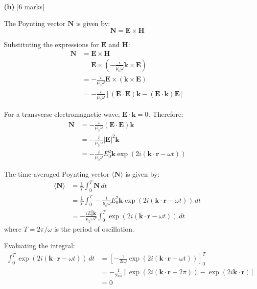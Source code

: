 \documentclass{article}
\begin{document}
\textbf{(b)} [6 marks]

The Poynting vector $\mathbf{N}$ is given by:
\begin{equation*}
\mathbf{N} = \mathbf{E} \times \mathbf{H}
\end{equation*}

Substituting the expressions for $\mathbf{E}$ and $\mathbf{H}$:
\begin{align*}
\mathbf{N} &= \mathbf{E} \times \mathbf{H} \\
&= \mathbf{E} \times \left( -\frac{i}{\mu_0 \omega} \mathbf{k} \times \mathbf{E} \right) \\
&= -\frac{i}{\mu_0 \omega} \mathbf{E} \times (\mathbf{k} \times \mathbf{E}) \\
&= -\frac{i}{\mu_0 \omega} [(\mathbf{E} \cdot \mathbf{E}) \mathbf{k} - (\mathbf{E} \cdot \mathbf{k}) \mathbf{E}]
\end{align*}

For a transverse electromagnetic wave, $\mathbf{E} \cdot \mathbf{k} = 0$. Therefore:
\begin{align*}
\mathbf{N} &= -\frac{i}{\mu_0 \omega} (\mathbf{E} \cdot \mathbf{E}) \mathbf{k} \\
&= -\frac{i}{\mu_0 \omega} |\mathbf{E}|^2 \mathbf{k} \\
&= -\frac{i}{\mu_0 \omega} E_0^2 \mathbf{k} \exp(2i (\mathbf{k} \cdot \mathbf{r} - \omega t))
\end{align*}

The time-averaged Poynting vector $\langle \mathbf{N} \rangle$ is given by:
\begin{align*}
\langle \mathbf{N} \rangle &= \frac{1}{T} \int_0^T \mathbf{N} \, dt \\
&= \frac{1}{T} \int_0^T -\frac{i}{\mu_0 \omega} E_0^2 \mathbf{k} \exp(2i (\mathbf{k} \cdot \mathbf{r} - \omega t)) \, dt \\
&= -\frac{i E_0^2 \mathbf{k}}{\mu_0 \omega T} \int_0^T \exp(2i (\mathbf{k} \cdot \mathbf{r} - \omega t)) \, dt
\end{align*}
where $T = 2\pi/\omega$ is the period of oscillation.

Evaluating the integral:
\begin{align*}
\int_0^T \exp(2i (\mathbf{k} \cdot \mathbf{r} - \omega t)) \, dt &= \left[ -\frac{1}{2i\omega} \exp(2i (\mathbf{k} \cdot \mathbf{r} - \omega t)) \right]_0^T \\
&= -\frac{1}{2i\omega} [\exp(2i (\mathbf{k} \cdot \mathbf{r} - 2\pi)) - \exp(2i \mathbf{k} \cdot \mathbf{r})] \\
&= 0
\end{align*}
\end{document}
